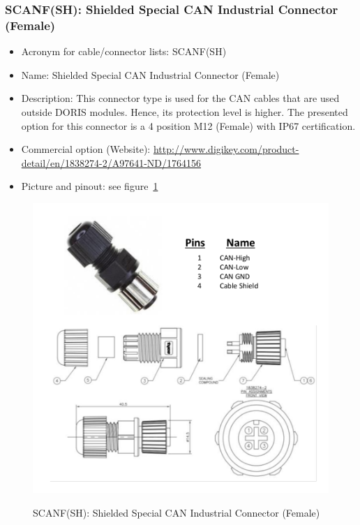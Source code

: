 \subsubsection{SCANF(SH): Shielded Special CAN Industrial Connector (Female)} \label{DEVICE:SCANF(SH)}
\begin{itemize}
  \item Acronym for cable/connector lists: SCANF(SH)
  \item Name: Shielded Special CAN Industrial Connector (Female)
  \item Description: This connector type is used for the CAN cables that are used outside DORIS modules. Hence, its protection level is higher. The presented option for this connector is a 4 position M12 (Female) with IP67 certification.
  \item Commercial option (Website): \href{http://www.digikey.com/product-detail/en/1838274-2/A97641-ND/1764156}{http://www.digikey.com/product-detail/en/1838274-2/A97641-ND/1764156}
  \item Picture and pinout: see figure~\ref{FIG:DEVICESCANF(SH)}
\end{itemize}
\begin{figure}
  \centering
  \includegraphics[angle=90,width=1\columnwidth]{figs/body02/FIGDEVICESCANF(SH).pdf}\\
  \caption[SCANF(SH): Shielded Special CAN Industrial Connector (Female)]{SCANF(SH): Shielded Special CAN Industrial Connector (Female)}
  \label{FIG:DEVICESCANF(SH)}
\end{figure}
